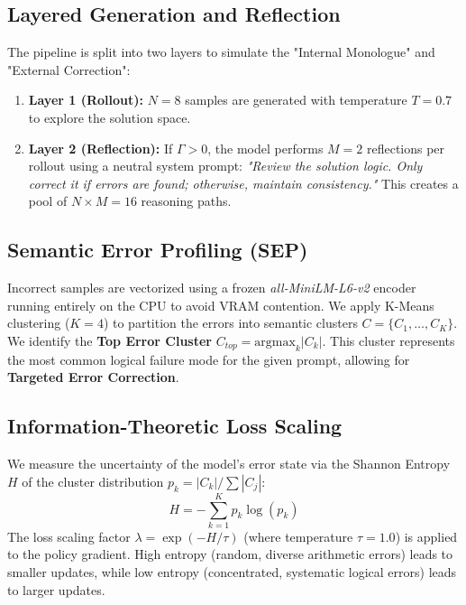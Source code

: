 \subsection{Layered Generation and Reflection}\label{subsec:layer-generation-reflection}
The pipeline is split into two layers to simulate the "Internal Monologue" and "External Correction":
\begin{enumerate}
    \item \textbf{Layer 1 (Rollout):} $N=8$ samples are generated with temperature $T=0.7$ to explore the solution space.
    \item \textbf{Layer 2 (Reflection):} If $\Gamma > 0$, the model performs $M=2$ reflections per rollout using a neutral system prompt: \textit{"Review the solution logic. Only correct it if errors are found; otherwise, maintain consistency."} This creates a pool of $N \times M = 16$ reasoning paths.
\end{enumerate}

\subsection{Semantic Error Profiling (SEP)}\label{subsec:SEP}
Incorrect samples are vectorized using a frozen \textit{all-MiniLM-L6-v2} encoder running entirely on the CPU to avoid VRAM contention. We apply K-Means clustering ($K=4$) to partition the errors into semantic clusters $C = \{C_1, \dots, C_K\}$. We identify the \textbf{Top Error Cluster} $C_{top} = \text{argmax}_k |C_k|$. This cluster represents the most common logical failure mode for the given prompt, allowing for \textbf{Targeted Error Correction}.

\subsection{Information-Theoretic Loss Scaling}\label{subsec:info-theoretic-loss}
We measure the uncertainty of the model's error state via the Shannon Entropy $H$ of the cluster distribution $p_k = |C_k| / \sum |C_j|$:
\begin{equation}
H = - \sum_{k=1}^K p_k \log(p_k)
\end{equation}
The loss scaling factor $\lambda = \exp(-H/\tau)$ (where temperature $\tau=1.0$) is applied to the policy gradient. High entropy (random, diverse arithmetic errors) leads to smaller updates, while low entropy (concentrated, systematic logical errors) leads to larger updates.


